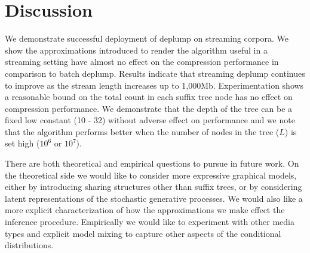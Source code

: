 \section{Discussion}
\label{sec:discussion}

We demonstrate successful deployment of deplump on streaming corpora.  We show the approximations introduced to render the algorithm useful in a streaming setting have almost no effect on the compression performance in comparison to batch deplump.   Results indicate that streaming deplump continues to improve as the stream length increases up to 1,000Mb.  Experimentation shows a reasonable bound on the total count in each suffix tree node has no effect on compression performance. We demonstrate that the depth of the tree can be a fixed low constant (10 - 32) without adverse effect on performance and we note that the algorithm performs better when the number of nodes in the tree ($L$) is set high ($10^6$ or $10^7$).

There are both theoretical and empirical questions to pursue in future work.  On the theoretical side we would like to consider more expressive graphical models, either by introducing sharing structures other than suffix trees, or by considering latent representations of the stochastic generative processes.  We would also like a more explicit characterization of how the approximations we make effect the inference procedure.  Empirically we would like to experiment with other media types and explicit model mixing to capture other aspects of the conditional distributions.  
